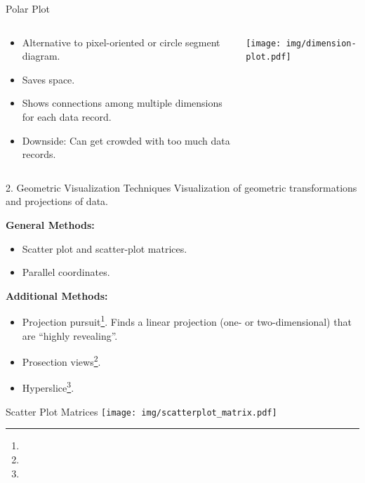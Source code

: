 \begin{frame}{Polar Plot}
	\begin{columns}[t]
		\begin{column}{0.5\textwidth}
			\begin{itemize}
				\item Alternative to pixel-oriented or circle segment diagram.
				\item Saves space.
				\item Shows connections among multiple dimensions for each data record.
				\item Downside: Can get crowded with too much data records.
			\end{itemize}
		\end{column}
		\begin{column}{0.5\textwidth}
			\vspace{-5em}
			\begin{center}
				\texttt{[image: img/dimension-plot.pdf]}
			\end{center}
		\end{column}
	\end{columns}
\end{frame}

\begin{frame}{2. Geometric Visualization Techniques}
	Visualization of geometric transformations and projections of data.

	\textbf{General Methods:}
	\begin{itemize}
		\item Scatter plot and scatter-plot matrices.
		\item Parallel coordinates.
	\end{itemize}

	\textbf{Additional Methods:}
	\begin{itemize}
		\item Projection pursuit\footnote{}.
		      Finds a linear projection (one- or two-dimensional) that are ``highly revealing''.
		\item Prosection views\footnote{}.
		\item Hyperslice\footnote{}.
	\end{itemize}
\end{frame}

\begin{frame}{Scatter Plot Matrices}
	\centering
	\texttt{[image: img/scatterplot\_matrix.pdf]}
\end{frame}

